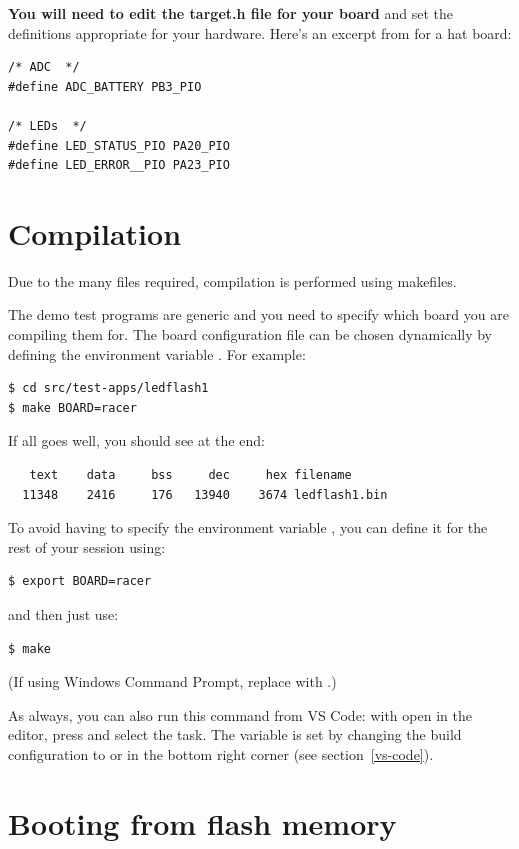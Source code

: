 \textbf{You will need to edit the target.h file for your board} and set
the definitions appropriate for your hardware. Here's an excerpt from
 for a hat board:

\begin{verbatim}
/* ADC  */
#define ADC_BATTERY PB3_PIO

/* LEDs  */
#define LED_STATUS_PIO PA20_PIO
#define LED_ERROR__PIO PA23_PIO
\end{verbatim}


\section{Compilation}
\label{compilation}

Due to the many files required, compilation is performed using
makefiles.

The demo test programs are generic and you need to specify which board
you are compiling them for. The board configuration file can be chosen
dynamically by defining the environment variable . For
example:
%
\begin{verbatim}
$ cd src/test-apps/ledflash1
$ make BOARD=racer
\end{verbatim}

If all goes well, you should see at the end:
%
\begin{verbatim}
   text    data     bss     dec     hex filename
  11348	   2416	    176	  13940	   3674	ledflash1.bin
\end{verbatim}

To avoid having to specify the environment variable , you
can define it for the rest of your session using:
%
\begin{verbatim}
$ export BOARD=racer
\end{verbatim}
%
and then just use:
%
\begin{verbatim}
$ make
\end{verbatim}
(If using Windows Command Prompt, replace  with .)

As always, you can also run this command from VS Code: with
 open in the editor, press
 and select the  task. The
 variable is set by changing the build configuration to
 or  in the bottom right corner (see
section~\ref{vs-code}).

\section{Booting from flash memory}
\label{booting-from-flash-memory}

